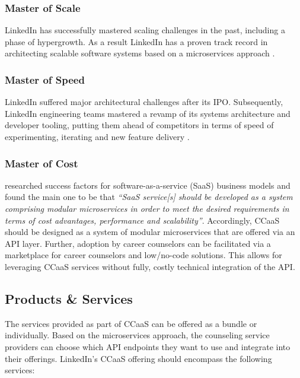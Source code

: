 \subsubsection{Master of Scale}

LinkedIn has successfully mastered scaling challenges in the past, including a phase of hypergrowth. As a result
LinkedIn has a proven track record in architecting scalable software systems based on a microservices approach
\citep{linkedinBriefHistoryScaling2015}. 

\subsubsection{Master of Speed}

LinkedIn suffered major architectural challenges after its IPO. Subsequently, LinkedIn engineering teams mastered a
revamp of its systems architecture and developer tooling, putting them ahead of competitors in terms of speed of
experimenting, iterating and new feature delivery \citep{vanceOperationInVersionCode2013}.

\subsubsection{Master of Cost}

\cite{floereckeSuccessFactorsSaaS2018} researched success factors for software-as-a-service (SaaS) business models and
found the main one to be that \textit{``SaaS service[s] should be developed as a system comprising modular microservices
in order to meet the desired requirements in terms of cost advantages, performance and scalability''}. Accordingly, CCaaS
should be designed as a system of modular microservices that are offered via an API layer. Further, adoption by career
counselors can be facilitated via a marketplace for career counselors and low/no-code solutions. This allows for leveraging
CCaaS services without fully, costly technical integration of the API.

\subsection{Products \& Services}

The services provided as part of CCaaS can be offered as a bundle or individually. Based on the microservices
approach, the counseling service providers can choose which API endpoints they want to use and integrate into 
their offerings. LinkedIn's CCaaS offering should encompass the following services:

